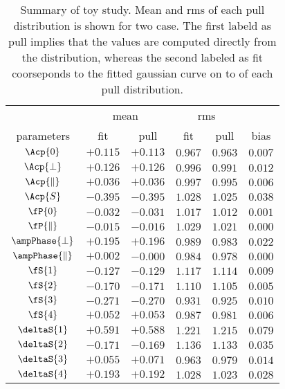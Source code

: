 \begin{table}
  \centering
  \begin{tabular}{c c c c c | c}
    \cline{2-5}
               & \multicolumn{2}{c}{mean} & \multicolumn{2}{c}{rms} &  \\
    \cline{2-6}
    parameters & fit & pull & fit & pull & bias \\
    \cline{1-6}
    $\Acp{0}$              & $+0.115$ & $+0.113$ & $0.967$ & $0.963$ & $0.007$\\
    $\Acp{\perp}$          & $+0.126$ & $+0.126$ & $0.996$ & $0.991$ & $0.012$\\
    $\Acp{\parallel}$      & $+0.036$ & $+0.036$ & $0.997$ & $0.995$ & $0.006$\\
    $\Acp{S}$              & $-0.395$ & $-0.395$ & $1.028$ & $1.025$ & $0.038$\\
    \hline                                                                    
    $\fP{0}$               & $-0.032$ & $-0.031$ & $1.017$ & $1.012$ & $0.001$\\
    $\fP{\parallel}$       & $-0.015$ & $-0.016$ & $1.029$ & $1.021$ & $0.000$\\
    $\ampPhase{\perp}$     & $+0.195$ & $+0.196$ & $0.989$ & $0.983$ & $0.022$\\
    $\ampPhase{\parallel}$ & $+0.002$ & $-0.000$ & $0.984$ & $0.978$ & $0.000$\\
    \hline                                                                    
    $\fS{1}$               & $-0.127$ & $-0.129$ & $1.117$ & $1.114$ & $0.009$\\  
    $\fS{2}$               & $-0.170$ & $-0.171$ & $1.110$ & $1.105$ & $0.005$\\
    $\fS{3}$               & $-0.271$ & $-0.270$ & $0.931$ & $0.925$ & $0.010$\\
    $\fS{4}$               & $+0.052$ & $+0.053$ & $0.987$ & $0.981$ & $0.006$\\
    $\deltaS{1}$           & $+0.591$ & $+0.588$ & $1.221$ & $1.215$ & $0.079$\\
    $\deltaS{2}$           & $-0.171$ & $-0.169$ & $1.136$ & $1.133$ & $0.035$\\   
    $\deltaS{3}$           & $+0.055$ & $+0.071$ & $0.963$ & $0.979$ & $0.014$\\
    $\deltaS{4}$           & $+0.193$ & $+0.192$ & $1.028$ & $1.023$ & $0.028$\\   
    \hline
  \end{tabular}
  \caption{Summary of toy study. Mean and rms of each pull distribution is shown for two case.
           The first labeld as pull implies that the values are computed directly from the distribution,
           whereas the second labeled as fit coorseponds to the fitted gaussian curve on to of each pull distribution.}
  \label{pull_table}
\end{table}



